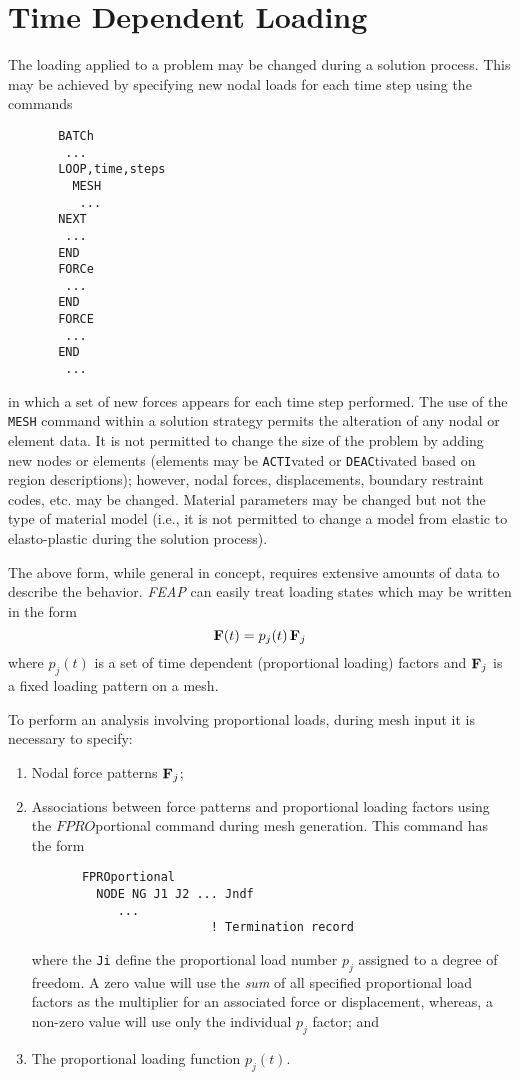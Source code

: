 \section{Time Dependent Loading}

The loading applied to a problem may be changed during a solution
process.  This may be achieved by specifying new nodal loads for
each time step using the commands
\begin{verbatim}
       BATCh
        ...
       LOOP,time,steps
         MESH
          ...
       NEXT
        ...
       END
       FORCe
        ...
       END
       FORCE
        ...
       END
        ...
\end{verbatim}
in which a set of new forces appears for each time step performed.  The
use of the {\tt MESH} command within a solution strategy permits the alteration
of any nodal or element data.  It is not permitted to change the size of the
problem by adding new nodes or elements (elements may be {\tt ACTI}vated
or {\tt DEAC}tivated based on region descriptions); however, nodal forces,
displacements, boundary restraint codes, etc. may be changed.
Material parameters may be changed but not the type of material model (i.e.,
it is not permitted to change a model from elastic to elasto-plastic during
the solution process).

The above form, while general in concept, requires extensive amounts of
data to describe the behavior.  {\sl FEAP} can easily treat
loading states which may be written in the form
\begin{equation}
\mathbf{F}(t) = p_j(t) \, \mathbf{F}_j
\end{equation}
where $p_j(t)$ is a set of time dependent (proportional loading) factors
and $\mathbf{F}_j$ is a fixed loading pattern on a mesh.

To perform an analysis involving proportional loads, during mesh input
it is necessary to specify:
\begin{enumerate}
\item
Nodal force patterns $\mathbf{F}_j$;
\item
Associations between force patterns and proportional loading factors
using the $FPRO$\-por\-tion\-al command during mesh generation.  This command
has the form
\begin{verbatim}
       FPROportional
         NODE NG J1 J2 ... Jndf
            ...
                         ! Termination record
\end{verbatim}
where the {\tt Ji} define the proportional load number $p_j$ assigned to
a degree of freedom.  A zero value will use the {\it sum} of all specified
proportional load factors as the multiplier for an associated force or
displacement, whereas, a non-zero value will use only the individual $p_j$
factor; and
\item
The proportional loading function $p_j(t)$.
\end{enumerate}

